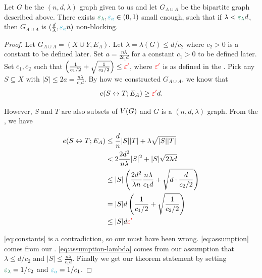 \documentclass[11pt]{article}
\newcommand{\EnDeeLambda}{(n, d, \lambda)}
\newcommand{\epsilonA}{\textcolor{ballblue}{\epsilon_a}}
\newcommand{\epsilonL}{\textcolor{cadmiumgreen}{\epsilon_\lambda}}
\newcommand{\BipartiteG}{G_{A \cup A}}
\newcommand{\ExpansionFactor}[1]{\lambda(#1)}
\begin{document}
\begin{lemma}\label{lemma:bipartitie-is-non-blocking}Let $G$ be the $\EnDeeLambda$ graph given to us and let $\BipartiteG$ be the bipartite graph described above. 
There exists $\epsilonL, \epsilonA  \in (0,1)$ small enough, such that if $\lambda < \epsilonL d$, then $\BipartiteG$ is $(\frac{d}{\lambda}, \epsilonA n)$ non-blocking.
\end{lemma}

\begin{proof}
Let $\BipartiteG = (X \cup Y, E_A)$. 
Let $\lambda = \ExpansionFactor{G} \leq d/c_2$ where $c_2 > 0$ is a constant to be defined later.
Set $a = \frac{n\lambda}{2c_1 d}$ for a constant $c_1 > 0$ to be defined later.
Set $c_1, c_2$ such that $\left(\frac{1}{c_1/2}  + \sqrt{\frac{1}{c_2/2}}\right) \leq \textcolor{red}{\varepsilon'}$, where $\textcolor{red}{\varepsilon'}$ is as defined in the .
Pick any $S \subseteq X$ with $|S| \leq 2a = \frac{n\lambda}{c_1 d}$.
By how we constructed $\BipartiteG$, we know that
\[ e(S \leftrightarrow T; E_A) \geq \textcolor{red}{\varepsilon'} d.\]

However, $S$ and $T$ are also subsets of $V(G)$ and $G$ is a $\EnDeeLambda$ graph.
From the , we have

\begin{align}
	e(S \leftrightarrow T; E_A) &\leq \frac{d}{n}|S||T| + \lambda\sqrt{|S||T|} \\
	&< 2\frac{2d^2}{n\lambda}|S|^2 + |S|\sqrt{2\lambda d} \label{eq:assumption}\\
	&\leq |S|\left(\frac{2d^2}{\lambda n} \frac{n\lambda}{c_1 d} + \sqrt{d\cdot \frac{d}{c_2/2}}\right) \label{eq:assumption-lambda}\\
	&= |S|d\left(\frac{1}{c_1/2}  + \sqrt{\frac{1}{c_2/2}}\right) \\
	&\leq |S|d\textcolor{red}{\varepsilon'} \label{eq:constants}
\end{align}


\eqref{eq:constants} is a contradiction, so our  must have been wrong.
\eqref{eq:assumption} comes from our .
\eqref{eq:assumption-lambda} comes from our assumption that $\lambda \leq d/c_2$ and $|S| \leq \frac{n\lambda}{c_1 d}$.
Finally we get our theorem statement by setting $\epsilonL = 1/c_2$ and $\epsilonA = 1/c_1$.


\end{proof}
\end{document}
